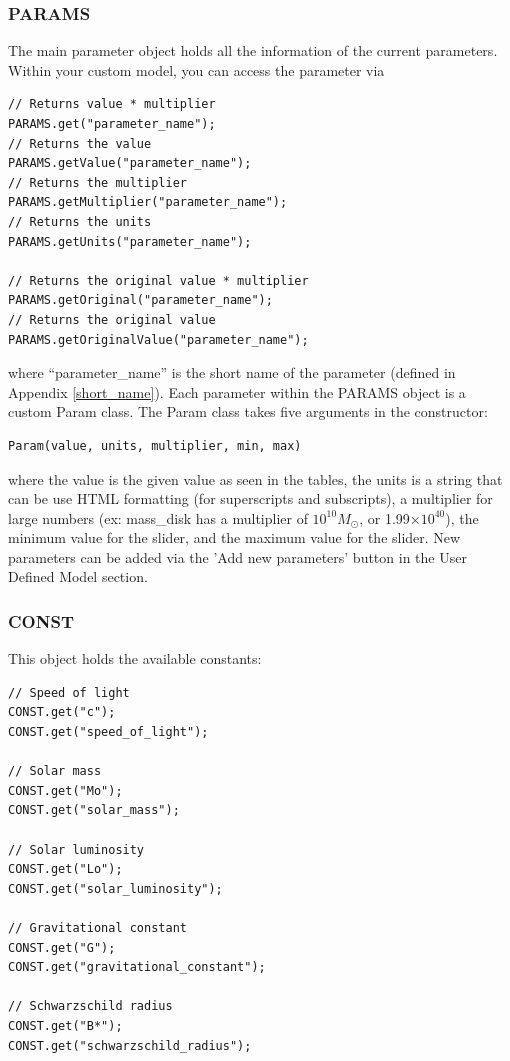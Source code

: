 \documentclass[conference]{IEEEtran}
\providecommand{\e}[1]{\ensuremath{\times 10^{#1}}}
\begin{document}
\subsubsection{PARAMS}
The main parameter object holds all the information of the current parameters. Within your custom model, you can access the parameter via
\begin{lstlisting}
// Returns value * multiplier
PARAMS.get("parameter_name"); 
// Returns the value
PARAMS.getValue("parameter_name"); 
// Returns the multiplier
PARAMS.getMultiplier("parameter_name"); 
// Returns the units
PARAMS.getUnits("parameter_name"); 

// Returns the original value * multiplier
PARAMS.getOriginal("parameter_name"); 
// Returns the original value
PARAMS.getOriginalValue("parameter_name"); 
\end{lstlisting}
where ``parameter\_name'' is the short name of the parameter (defined in Appendix \ref{short_name}). Each parameter within the PARAMS object is a custom Param class. The Param class takes five arguments in the constructor:
\begin{lstlisting}
Param(value, units, multiplier, min, max)
\end{lstlisting}
where the value is the given value as seen in the tables, the units is a string that can be use HTML formatting (for superscripts and subscripts), a multiplier for large numbers (ex: mass\_disk has a multiplier of $10^{10} M_{\odot}$, or 1.99\e{40}), the minimum value for the slider, and the maximum value for the slider. New parameters can be added via the 'Add new parameters' button in the User Defined Model section.


\subsubsection{CONST}
This object holds the available constants:
\begin{lstlisting}
// Speed of light
CONST.get("c");
CONST.get("speed_of_light");

// Solar mass
CONST.get("Mo");
CONST.get("solar_mass");

// Solar luminosity
CONST.get("Lo");
CONST.get("solar_luminosity");

// Gravitational constant
CONST.get("G");
CONST.get("gravitational_constant");

// Schwarzschild radius
CONST.get("B*");
CONST.get("schwarzschild_radius");
\end{lstlisting}
\end{document}
